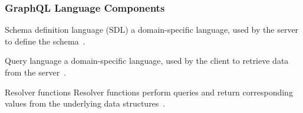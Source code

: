 \begin{frame}\frametitle{GraphQL Language Components}

\begin{block}{Schema definition language (SDL)}
a domain-specific language, used by the server to define the schema~\cite{migrating-to-gql}.
\end{block}

\begin{block}{Query language}
a domain-specific language, used by the client to retrieve data from the server~\cite{initial-analysis-of-gql}. 
\end{block}

\begin{block}{Resolver functions}
Resolver functions perform queries and return corresponding values from the underlying data structures~\cite{migrating-to-gql}.
\end{block}

\end{frame}
